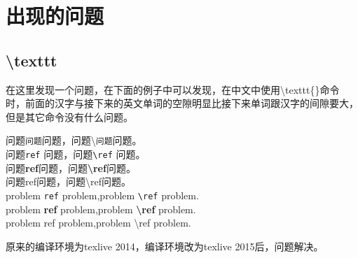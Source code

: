 \section{出现的问题}
\subsection{\textbackslash texttt}
在这里发现一个问题，在下面的例子中可以发现，在中文中使用\textbackslash texttt\{\}命令时，前面的汉字与接下来的英文单词的空隙明显比接下来单词跟汉字的间隙要大，但是其它命令没有什么问题。

\begin{center}
\noindent 问题\texttt{问题}问题，问题\textbackslash\texttt{问题}问题。\\
问题\texttt{ref} 问题，问题\texttt{\textbackslash ref} 问题。\\
问题\textbf{ref}问题，问题\textbf{\textbackslash ref}问题。\\
问题\textsf{ref}问题，问题\textsf{\textbackslash ref}问题。\\
problem \texttt{ref} problem,problem \texttt{\textbackslash ref} problem.\\
problem \textbf{ref} problem,problem \textbf{\textbackslash ref} problem.\\
problem \textsf{ref} problem,problem \textsf{\textbackslash ref} problem.
\end{center}

原来的编译环境为texlive 2014，编译环境改为texlive 2015后，问题解决。
